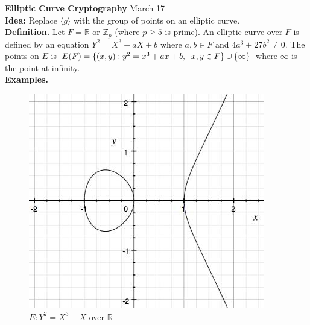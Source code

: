 \documentclass[a4paper,12pt]{article}
\begin{document}
\clearpage
{\bf Elliptic Curve Cryptography}
\hfill
March 17 \\

{\bf Idea:}
Replace $\langle g \rangle$ with the group of points on an elliptic curve. \\

{\bf Definition.}
Let $F = \mathbb{R}$ or $\mathbb{Z}_p$ (where $p \ge 5$ is prime). An elliptic curve over $F$ is defined by an equation $Y^2 = X^3 + aX + b$ where $a,b \in F$ and $4a^3 + 27b^2 \ne 0$. The points on $E$ is $E(F) = \{(x,y) : y^2 = x^3 + ax + b, \hspace{2mm} x,y \in F\} \cup \{\infty\}$ where $\infty$ is the point at infinity. \\

{\bf Examples.}

\begin{figure}[h!]
\begin{minipage}{0.45\textwidth}
\includegraphics[width=\textwidth]{fig-mar17-1}
\caption{$E: Y^2 = X^3 - X$ over $\mathbb{R}$}
\end{minipage}
\hspace{0.05\textwidth}
\begin{minipage}{0.45\textwidth}

\end{minipage}
\end{figure}
\end{document}
